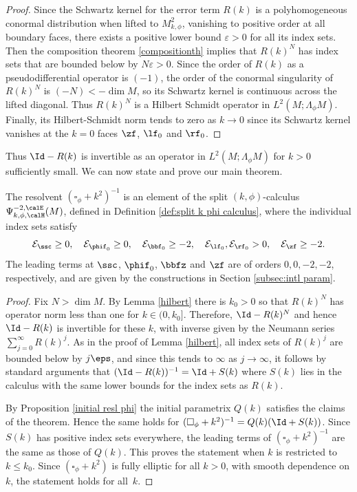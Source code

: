 \begin{proof}
Since the Schwartz kernel for the error term $R(k)$ is a polyhomogeneous
conormal distribution when lifted to $M^2_{k,\phi}$, vanishing to positive order at all boundary faces,
there exists a positive lower bound $\varepsilon > 0$ for all its index sets.
Then the composition theorem \ref{compositionth} implies that $R(k)^N$ has index sets that are bounded below by
$N\varepsilon>0$. Since the order of $R(k)$ as a pseudodifferential operator is $(-1)$, the order of the conormal singularity of $R(k)^N$ is $(-N)<-\dim M$, so its Schwartz kernel is continuous across the lifted diagonal.
Thus $R(k)^N$ is a Hilbert Schmidt operator in $L^2(M;\Lambda_\phi M)$.
Finally, its Hilbert-Schmidt norm tends to zero as $k\to0$ since its Schwartz kernel vanishes at the $k=0$ faces $\zf$, $\lf_0$ and $\rf_0$.
\end{proof}

Thus $\Id - R(k)$ is invertible as an operator in $L^2(M;\Lambda_\phi M)$ for $k>0$ sufficiently small.
We can now state and prove our main theorem.

\begin{Th} \label{thm:main thm detail}
The resolvent $(\square_{\phi} + k^{2})^{-1}$ is an element of the split $(k,\phi)$-calculus
$\Psi_{k, \phi,\calH}^{-2,\calE}(M)$, defined in Definition \ref{def:split k phi calculus}, where the individual index sets satisfy\vspace*{-3pt}
\begin{equation}\label{lower-bounds-index-sets}
\mathcal{E}_{\ssc} \geq 0,\quad
\mathcal{E}_{\phif_0} \geq 0, \quad
\mathcal{E}_{\bbf_0} \geq -2, \quad \mathcal{E}_{\lf_0}, \mathcal{E}_{\rf_0} >0,
\quad \mathcal{E}_{\zf} \geq -2.
\end{equation}
The leading terms at $\ssc$, $\phif_0$, $\bbfz$ and $\zf$ are of orders $0,0,-2,-2$, respectively, and are given by the constructions in Section \ref{subsec:intl param}.
\end{Th}

\begin{proof}
Fix $N>\dim M$.
By Lemma \ref{hilbert} there is $k_0>0$ so that $R(k)^N$ has operator norm less than one for $k\in(0,k_0]$.
Therefore, $\Id - R(k)^N$ and hence
$\Id - R(k)$ is invertible for these $k$, with inverse given by the Neumann series $\sum_{j=0}^\infty R(k)^j$.
As in the proof of Lemma \ref{hilbert}, all index sets of $R(k)^{j}$ are bounded below by $j\eps$, and since this tends to $\infty$ as $j\to\infty$, it follows by standard arguments that $(\Id - R(k))^{-1}=\Id+S(k)$ where $S(k)$ lies in the calculus with the same lower bounds for the index sets as $R(k)$.

By Proposition \ref{initial resl phi} the initial parametrix $Q(k)$ satisfies the claims of the theorem. Hence the same holds for $(\square_\phi+k^2)^{-1} = Q(k)(\Id+S(k))$.
Since $S(k)$ has positive index sets everywhere, the leading terms of $(\square_\phi+k^2)^{-1}$ are the same as those of $Q(k)$.
This proves the statement when $k$ is restricted to $k\leq k_0$. Since
$(\square_{\phi} + k^{2})$ is fully elliptic for all $k>0$, with smooth dependence on $k$, the statement holds for all~$k$.
\end{proof}

